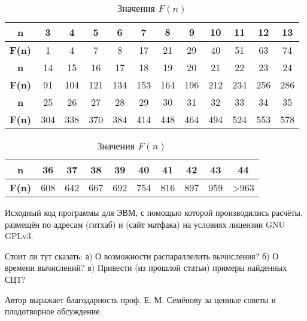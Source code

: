 \documentclass{article}
\begin{document}
\begin{table}[H]
\caption{Значения $F(n)$}
\label{tabular:pc_counted}
\begin{center}
\begin{tabular}{|c|c|c|c|c|c|c|c|c|c|c|c|}
\hline
\textbf{n}    &  3 & 4 & 5 & 6 &  7 &  8 &  9 & 10 & 11 & 12 & 13 \\
\hline
\textbf{F(n)} &  1 & 4 & 7 & 8 & 17 & 21 & 29 & 40 & 51 & 63 & 74  \\
\hline
\hline
\textbf{n}    &  14 &  15 &  16 &  17 &  18 &  19 &  20 &  21 &  22 &  23 &  24 \\
\hline
\textbf{F(n)} &  91 & 104 & 121 & 134 & 153 & 164 & 196 & 212 & 234 & 256 & 286  \\
\hline
\hline
\textbf{n}    &  25 &  26 &  27 &  28 &  29 &  30 &  31 &  32 &  33 &  34 &  35 \\
\hline
\textbf{F(n)} & 304 & 338 & 370 & 384 & 414 & 448 & 464 & 494 & 524 & 553 & 578  \\
\hline
\end{tabular}
\begin{tabular}{|c|c|c|c|c|c|c|c|c|c|}
\hline
\textbf{n}    &  36 &  37 &  38 &  39 &  40 &  41 &  42 &  43 & 44 \\

\hline
\textbf{F(n)} & 608 & 642 & 667 & 692 & 754 & 816 & 897 & 959 & >963 \\
\hline
\end{tabular}
\end{center}
\end{table}


Исходный код программы для ЭВМ, с помощью которой производились расчёты, размещён по адресам (гитхаб) и (сайт матфака) на условиях лицензии GNU GPLv3. 





Стоит ли тут сказать:
а) О возможности распараллелить вычисления?
б) О времени вычислений?
в) Привести (из прошлой статьи) примеры найденных СЦТ?



Автор выражает благодарность проф. Е. М. Семёнову за ценные советы и плодотворное обсуждение.













\end{document}
